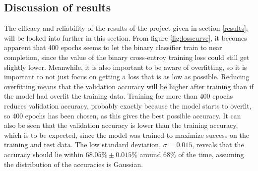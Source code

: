 \documentclass[11pt, fleqn, titlepage]{article}
\begin{document}
	\subsection{Discussion of results}\label{discussionOfResults}
	The efficacy and reliability of the results of the project given in section \ref{results}, will be looked into further in this section. From figure \ref{fig:losscurve}, it becomes apparent that 400 epochs seems to let the binary classifier train to near completion, since the value of the binary cross-entroy training loss could still get slightly lower. Meanwhile, it is also important to be aware of overfitting, so it is important to not just focus on getting a loss that is as low as possible. Reducing overfitting means that the validation accuracy will be higher after training than if the model had overfit the training data. Training for more than 400 epochs reduces validation accuracy, probably exactly because the model starts to overfit, so 400 epochs has been chosen, as this gives the best possible accuracy. It can also be seen that the validation accuracy is lower than the training accuracy, which is to be expected, since the model was trained to maximize success on the training and test data. The low standard deviation, $ \sigma=0.015 $, reveals that the accuracy should lie within $68.05\% \pm 0.015\%$ around $68\%$ of the time, assuming the distribution of the accuracies is Gaussian.
	
\end{document}
